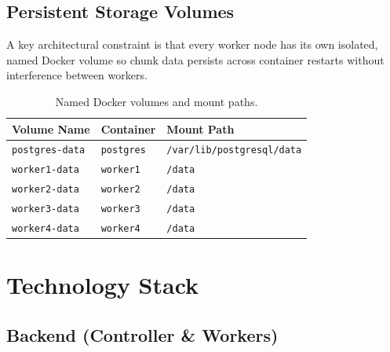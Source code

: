 \documentclass[12pt,a4paper]{report}
\begin{document}
\section{Persistent Storage Volumes}

A key architectural constraint is that every worker node has its own isolated, named Docker volume so chunk data persists across container restarts without interference between workers.

\begin{table}[H]
  \centering
  \caption{Named Docker volumes and mount paths.}
  \label{tab:volumes}
  \begin{tabular}{lll}
    \toprule
    \textbf{Volume Name}        & \textbf{Container}  & \textbf{Mount Path} \\
    \midrule
    \texttt{postgres-data}      & \texttt{postgres}   & \texttt{/var/lib/postgresql/data} \\
    \texttt{worker1-data}       & \texttt{worker1}    & \texttt{/data} \\
    \texttt{worker2-data}       & \texttt{worker2}    & \texttt{/data} \\
    \texttt{worker3-data}       & \texttt{worker3}    & \texttt{/data} \\
    \texttt{worker4-data}       & \texttt{worker4}    & \texttt{/data} \\
    \bottomrule
  \end{tabular}
\end{table}

\chapter{Technology Stack}

\section{Backend (Controller \& Workers)}
\end{document}

